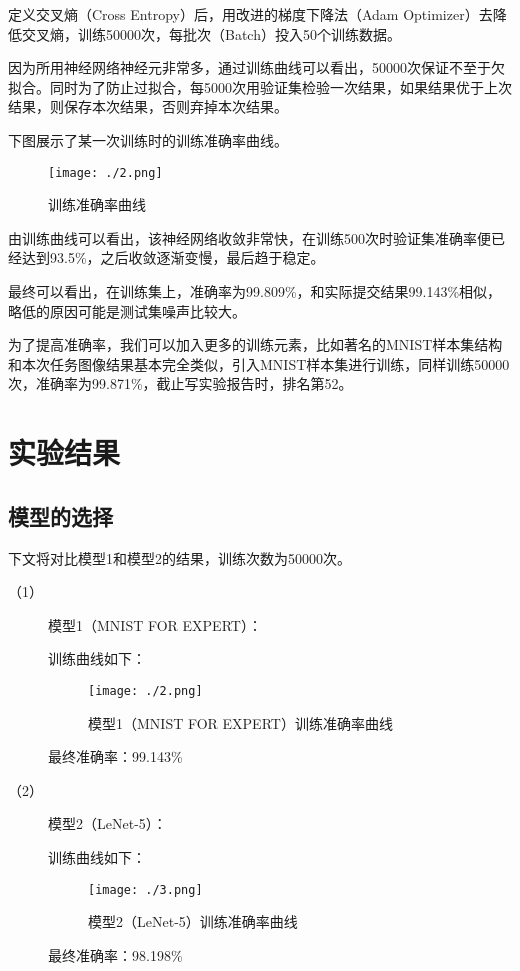 \documentclass{article}
\begin{document}
定义交叉熵（Cross Entropy）后，用改进的梯度下降法（Adam Optimizer）去降低交叉熵，训练50000次，每批次（Batch）投入50个训练数据。

因为所用神经网络神经元非常多，通过训练曲线可以看出，50000次保证不至于欠拟合。同时为了防止过拟合，每5000次用验证集检验一次结果，如果结果优于上次结果，则保存本次结果，否则弃掉本次结果。

下图展示了某一次训练时的训练准确率曲线。

 \begin{figure}[H]
  \centering\texttt{[image: ./2.png]}
  \caption{训练准确率曲线}
  \end{figure}

由训练曲线可以看出，该神经网络收敛非常快，在训练500次时验证集准确率便已经达到93.5\%，之后收敛逐渐变慢，最后趋于稳定。

最终可以看出，在训练集上，准确率为99.809\%，和实际提交结果99.143\%相似，略低的原因可能是测试集噪声比较大。

为了提高准确率，我们可以加入更多的训练元素，比如著名的MNIST样本集结构和本次任务图像结果基本完全类似，引入MNIST样本集进行训练，同样训练50000次，准确率为99.871\%，截止写实验报告时，排名第52。


\section{实验结果}

\subsection{模型的选择}

下文将对比模型1和模型2的结果，训练次数为50000次。

\begin{description}

\item[（1）]模型1（MNIST FOR EXPERT）：

训练曲线如下：

 \begin{figure}[H]
  \centering\texttt{[image: ./2.png]}
  \caption{模型1（MNIST FOR EXPERT）训练准确率曲线}
  \end{figure}

最终准确率：99.143\%

\item[（2）]模型2（LeNet-5）：

训练曲线如下：

 \begin{figure}[H]
  \centering\texttt{[image: ./3.png]}
  \caption{模型2（LeNet-5）训练准确率曲线}
  \end{figure}

最终准确率：98.198\%

\end{description}
\end{document}
